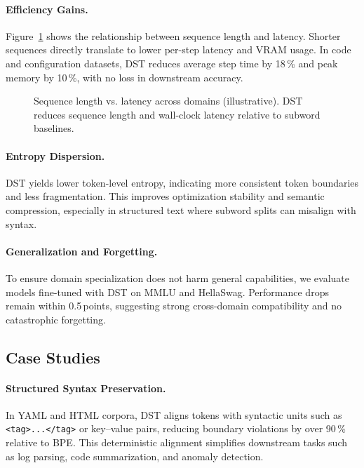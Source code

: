 \paragraph{Efficiency Gains.}
Figure~\ref{fig:dst_efficiency} shows the relationship between sequence length and latency.
Shorter sequences directly translate to lower per-step latency and VRAM usage.
In code and configuration datasets, DST reduces average step time by 18\,\% and peak memory by 10\,\%, with no loss in downstream accuracy.

\begin{figure}[t]
  \centering
  \setlength{\fboxsep}{0pt}\fbox{\rule{0pt}{100pt}\rule{220pt}{0pt}}
  \caption{Sequence length vs. latency across domains (illustrative). DST reduces sequence length and wall-clock latency relative to subword baselines.}
  \label{fig:dst_efficiency}
\end{figure}

\paragraph{Entropy Dispersion.}
DST yields lower token-level entropy, indicating more consistent token boundaries and less fragmentation.
This improves optimization stability and semantic compression, especially in structured text where subword splits can misalign with syntax.

\paragraph{Generalization and Forgetting.}
To ensure domain specialization does not harm general capabilities, we evaluate models fine-tuned with DST on MMLU and HellaSwag.
Performance drops remain within 0.5\,points, suggesting strong cross-domain compatibility and no catastrophic forgetting.

\subsection{Case Studies}

\paragraph{Structured Syntax Preservation.}
In YAML and HTML corpora, DST aligns tokens with syntactic units such as \texttt{<tag>...</tag>} or key–value pairs, reducing boundary violations by over 90\,\% relative to BPE.
This deterministic alignment simplifies downstream tasks such as log parsing, code summarization, and anomaly detection.

